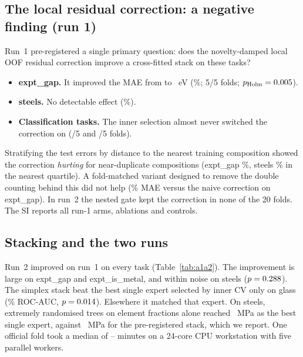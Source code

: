 \subsection{The local residual correction: a negative finding (run 1)}
Run~1 pre-registered a single primary question: does the novelty-damped local OOF residual correction improve a cross-fitted stack on these tasks?
\begin{itemize}
\item \textbf{expt\_gap.} It improved the MAE from \GapStack{} to \GapStackLocal{}~eV (\RelGap\%; 5/5 folds; $p_\mathrm{Holm}=0.005$).
\item \textbf{steels.} No detectable effect (\RelSteels\%).
\item \textbf{Classification tasks.} The inner selection almost never switched the correction on (\GlassNaiveOn/5 and \MetalNaiveOn/5 folds).
\end{itemize}
Stratifying the test errors by distance to the nearest training composition showed the correction \emph{hurting} for near-duplicate compositions (expt\_gap \GapLocalQOne\%, steels \SteelsLocalQOne\% in the nearest quartile).
A fold-matched variant designed to remove the double counting behind this did not help (\GapStackFmVsStackLocalRel\% MAE versus the naive correction on expt\_gap).
In run~2 the nested gate kept the correction in none of the 20 folds.
The SI reports all run-1 arms, ablations and controls.

\subsection{Stacking and the two runs}
Run~2 improved on run~1 on every task (Table~\ref{tab:a1a2}). The improvement is large on expt\_gap and expt\_is\_metal, and within noise on steels ($p=0.288$).
The simplex stack beat the best single expert selected by inner CV only on glass (\AtwoStackVsBestGlass\% ROC-AUC, $p=0.014$). Elsewhere it matched that expert.
On steels, extremely randomised trees on element fractions alone reached \AtwoBestSteels~MPa as the best single expert, against \AtwoStackSteels~MPa for the pre-registered stack, which we report.
One official fold took a median of \AtwoWallMinSteels--\AtwoWallMinGap{} minutes on a 24-core CPU workstation with five parallel workers.

\begin{table}[t]
\centering
\caption{Board metric of the two pre-registered pipelines on the official folds, with a paired bootstrap $p$-value for the difference.}
\label{tab:a1a2}

\end{table}
